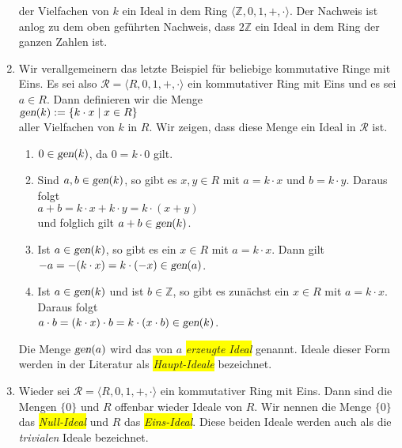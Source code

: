 \begin{enumerate}
      der Vielfachen von $k$  ein Ideal in dem Ring $\langle \mathbb{Z}, 0, 1, +, \cdot \rangle$.
      Der Nachweis ist anlog zu dem oben gef\"{u}hrten Nachweis, dass $2\mathbb{Z}$ ein Ideal
      in dem Ring der ganzen Zahlen ist.
\item Wir verallgemeinern das letzte Beispiel f\"{u}r beliebige kommutative Ringe mit Eins.
      Es sei also $\mathcal{R} = \langle R, 0, 1, +, \cdot \rangle$ ein kommutativer Ring
      mit Eins und es sei $a \in R$.  Dann definieren wir die Menge
      \\
      \hspace*{1.3cm}
      $\textsl{gen}(k) := \{ k \cdot x \mid x \in R \}$
      \\[0.2cm]
      aller Vielfachen von $k$ in $R$.  Wir zeigen, dass diese Menge ein Ideal in
      $\mathcal{R}$ ist.
      \begin{enumerate}
      \item $0 \in \textsl{gen}(k)$, da $0 = k \cdot 0$ gilt. 
      \item Sind $a, b \in \textsl{gen}(k)$, so gibt es $x,y \in R$ mit $a = k \cdot x$ und 
            $b = k \cdot y$.  Daraus folgt
            \\[0.2cm]
            \hspace*{1.3cm}
            $a + b = k \cdot x + k \cdot y = k \cdot (x + y)$
            \\[0.2cm]
            und folglich gilt $a+b \in \textsl{gen}(k)$.
      \item Ist $a \in \textsl{gen}(k)$, so gibt es ein $x \in R$ mit $a = k \cdot x$.  Dann gilt
            \\[0.2cm]
            \hspace*{1.3cm}
            $-a = - (k \cdot x) = k \cdot (-x) \in \textsl{gen}(a)$.
      \item Ist $a \in \textsl{gen}(k)$ und ist $b \in \mathbb{Z}$, so gibt es zun\"{a}chst ein
            $x \in R$ mit $a = k \cdot x$.  Daraus folgt
            \\[0.2cm]
            \hspace*{1.3cm}
            $a \cdot b = (k \cdot x) \cdot b = k \cdot (x \cdot b) \in \textsl{gen}(k)$.
      \end{enumerate}
      Die Menge $\textsl{gen}(a)$ wird das von $a$ \colorbox{yellow}{\emph{erzeugte Ideal}} genannt.
      Ideale dieser Form werden in der Literatur als \colorbox{yellow}{\emph{Haupt-Ideale}} bezeichnet.
\item Wieder sei $\mathcal{R} = \langle R, 0, 1, +, \cdot \rangle$ ein kommutativer Ring mit Eins.  Dann
      sind die Mengen $\{0\}$ und $R$ offenbar wieder Ideale von $R$.  Wir nennen  die Menge $\{0\}$
      das \colorbox{yellow}{\emph{Null-Ideal}} und $R$ das \colorbox{yellow}{\emph{Eins-Ideal}}.  Diese
      beiden Ideale werden auch als die \emph{trivialen} Ideale bezeichnet.
      \eox
\end{enumerate}


